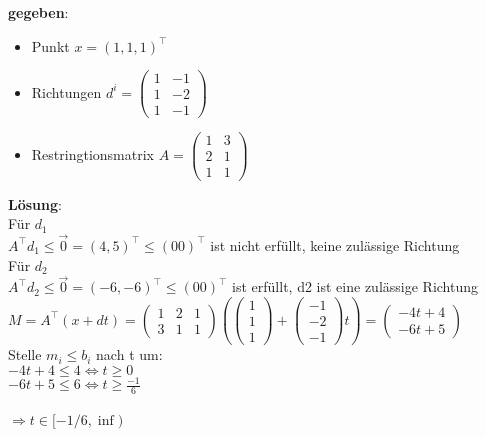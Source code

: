 \documentclass[12pt,a4paper, hyperref]{article}
\begin{document}
\textbf{gegeben}:
\begin{itemize}
\item Punkt $x = (1, 1, 1)^\intercal$
\item Richtungen $d^{i} = \begin{pmatrix} 1 & -1 \\ 1 & -2 \\ 1 & -1 \end{pmatrix}$
\item Restringtionsmatrix  $A = \begin{pmatrix} 1 & 3 \\ 2 & 1 \\ 1 & 1 \end{pmatrix}$
\end{itemize}
\textbf{Lösung}:\\
Für $d_1$\\
$A^\intercal d_1 \leq \vec{0} = (4, 5)^\intercal \leq (0 0)^\intercal$ ist nicht erfüllt, keine zulässige Richtung\\

Für $d_2$\\
$A^\intercal d_2 \leq \vec{0} = (-6, -6)^\intercal \leq (0 0)^\intercal$ ist erfüllt, d2 ist eine zulässige Richtung\\

$M = A^\intercal (x+dt) = \begin{pmatrix} 1 & 2 & 1 \\ 3 & 1 & 1 \end{pmatrix} (\begin{pmatrix}1 \\ 1 \\ 1 \end{pmatrix}+ \begin{pmatrix} -1 \\ -2 \\ -1 \end{pmatrix}t)
= \begin{pmatrix} -4t + 4 \\ -6t + 5 \end{pmatrix}$\\

Stelle $m_i \leq b_i$ nach t um:\\
$-4t +4 \leq 4 \Leftrightarrow t \geq 0$\\
$-6t +5 \leq 6 \Leftrightarrow t \geq \frac{-1}{6}$\\
\hspace{1pt}\\
$\Rightarrow t \in [-1/6, \inf)$
\end{document}

